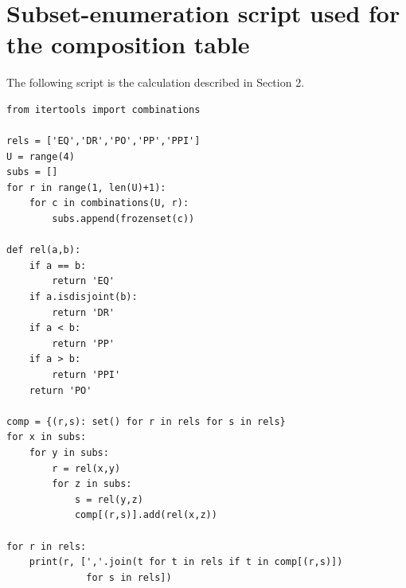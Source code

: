 \documentclass[11pt]{article}
\begin{document}
\appendix
\section{Subset-enumeration script used for the composition table}

The following script is the calculation described in Section 2.

\begingroup\footnotesize
\begin{verbatim}
from itertools import combinations

rels = ['EQ','DR','PO','PP','PPI']
U = range(4)
subs = []
for r in range(1, len(U)+1):
    for c in combinations(U, r):
        subs.append(frozenset(c))

def rel(a,b):
    if a == b:
        return 'EQ'
    if a.isdisjoint(b):
        return 'DR'
    if a < b:
        return 'PP'
    if a > b:
        return 'PPI'
    return 'PO'

comp = {(r,s): set() for r in rels for s in rels}
for x in subs:
    for y in subs:
        r = rel(x,y)
        for z in subs:
            s = rel(y,z)
            comp[(r,s)].add(rel(x,z))

for r in rels:
    print(r, [','.join(t for t in rels if t in comp[(r,s)])
              for s in rels])
\end{verbatim}
\endgroup
\end{document}

